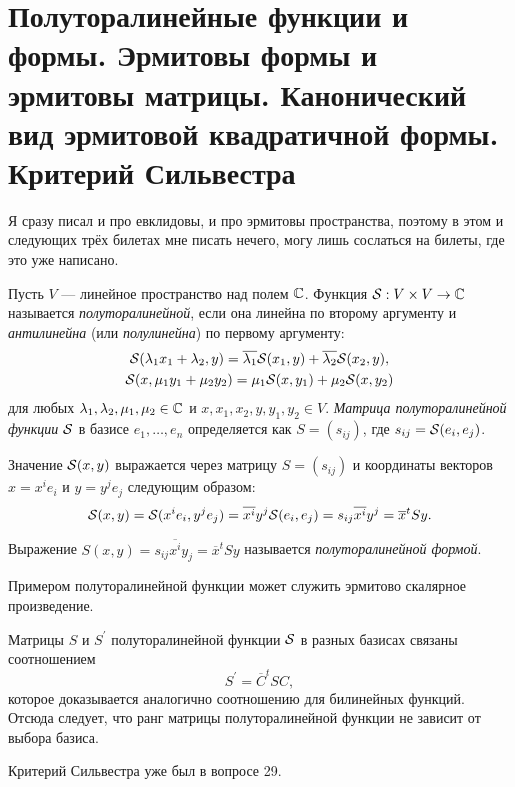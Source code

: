 \section{Полуторалинейные функции и формы. Эрмитовы формы и эрмитовы матрицы.
Канонический вид эрмитовой квадратичной формы. Критерий Сильвестра}

Я сразу писал и про евклидовы, и про эрмитовы пространства, поэтому в этом и следующих трёх билетах мне писать нечего, могу лишь сослаться на билеты, где это уже написано.

\begin{definition}
    Пусть $V$ --- линейное пространство над полем $\C$. Функция $\S: V \times V \to \C$ называется \textit{полуторалинейной}, если она линейна по второму аргументу и \textit{антилинейна} (или \textit{полулинейна}) по первому аргументу:
    \begin{gather*}
        \S(\lambda_1x_1 + \lambda_2, y) = \overline{\lambda_1}\S(x_1, y) + \overline{\lambda_2}\S(x_2, y),\\
        \S(x, \mu_1y_1 + \mu_2y_2) = \mu_1\S(x, y_1) + \mu_2\S(x, y_2)
    \end{gather*}
    для любых $\lambda_1, \lambda_2, \mu_1, \mu_2 \in \C$ и $x, x_1, x_2, y, y_1, y_2 \in V$. \textit{Матрица полуторалинейной функции $\S$} в базисе $e_1, \ldots, e_n$ определяется как $S = (s_{ij})$, где $s_{ij} = \S(e_i, e_j)$.
\end{definition}

Значение $\S(x, y)$ выражается через матрицу $S = (s_{ij})$ и координаты векторов $x = x^ie_i$ и $y = y^je_j$ следующим образом:
\[
    \S(x, y) = \S(x^ie_i, y^je_j) = \overline{x^i}y^j\S(e_i, e_j) = s_{ij}\overline{x^i}y^j = \overline{x}^tSy.
\]

\begin{definition}
    Выражение $S(x, y) = s_{ij}\overline{x^i}y_j = \overline{x}^tSy$ называется \textit{полуторалинейной формой}.
\end{definition}

Примером полуторалинейной функции может служить эрмитово скалярное произведение.

Матрицы $S$ и $S^\prime$ полуторалинейной функции $\S$ в разных базисах связаны соотношением
\[
    S^\prime = \overline{C}^tSC,
\]
которое доказывается аналогично соотношению для билинейных функций. Отсюда следует, что ранг матрицы полуторалинейной функции не зависит от выбора базиса.

Критерий Сильвестра уже был в вопросе 29.

